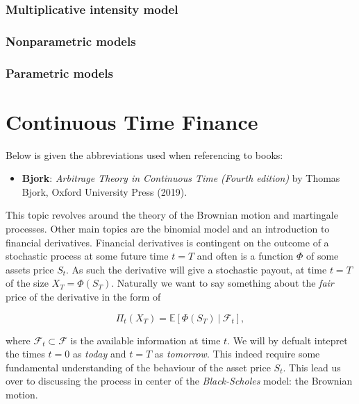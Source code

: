 \documentclass[a4paper,10pt,openany]{book}
\providecommand{\tightlist}{%
 \setlength{\itemsep}{0pt}\setlength{\parskip}{0pt}}
\begin{document}
\hypertarget{multiplicative-intensity-model}{%
\subsection{Multiplicative intensity model}\label{multiplicative-intensity-model}}

\hypertarget{nonparametric-models}{%
\subsection{Nonparametric models}\label{nonparametric-models}}

\hypertarget{parametric-models}{%
\subsection{Parametric models}\label{parametric-models}}

\hypertarget{continuous-time-finance}{%
\chapter{Continuous Time Finance}\label{continuous-time-finance}}

Below is given the abbreviations used when referencing to books:

\begin{itemize}
\tightlist
\item
  \textbf{Bjork}: \emph{Arbitrage Theory in Continuous Time (Fourth edition)} by Thomas Bjork, Oxford University Press (2019).\cite{bjork2009}
\end{itemize}

This topic revolves around the theory of the Brownian motion and martingale processes. Other main topics are the binomial model and an introduction to financial derivatives. Financial derivatives is contingent on the outcome of a stochastic process at some future time \(t=T\) and often is a function \(\Phi\) of some assets price \(S_t\). As such the derivative will give a stochastic payout, at time \(t=T\) of the size \(X_T=\Phi(S_T)\). Naturally we want to say something about the \emph{fair} price of the derivative in the form of

\[
\Pi_t(X_T)=\mathbb{E}\left[\Phi(S_T)\ \vert\ \mathcal{F}_t\right],
\]

where \(\mathcal{F}_t\subset\mathcal{F}\) is the available information at time \(t\). We will by defualt intepret the times \(t=0\) as \emph{today} and \(t=T\) as \emph{tomorrow}. This indeed require some fundamental understanding of the behaviour of the asset price \(S_t\). This lead us over to discussing the process in center of the \emph{Black-Scholes} model: the Brownian motion.
\end{document}

